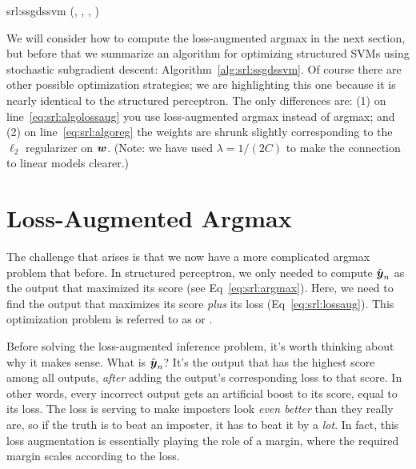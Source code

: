 \newalgorithm%
  {srl:ssgdssvm}%
  {(, , \VARm{\lambda}, \VARm{\ell})}
  {
        \SETST{$\hat \vy$}{$\argmax_{\VARm{\hat\vy} \in \cY(\VARm{\vx})} \dotp{\VARm{\vw}}{\phi(\VARm{\vx},\VARm{\hat\vy})} + \VARm{\ell}(\VARm{\vy}, \VARm{\hat\vy})$} \label{eq:srl:algolossaug}
        \IF{\VAR{$\hat \vy$} $\neq$ \VAR{$\vy$}}
          \SETST{$\vw$}{$\VARm{\vw} + \phi(\VARm{\vx}, \VARm{\vy}) - \phi(\VARm{\vx}, \VARm{\hat \vy})$}
        \ENDIF
         \label{eq:srl:algoreg}
      \ENDFOR
    \ENDFOR
    \RETURN \VAR{$\vw$}
  }


We will consider how to compute the loss-augmented argmax in the next section,
but before that we summarize an algorithm for optimizing structured SVMs using stochastic subgradient descent: Algorithm~\ref{alg:srl:ssgdssvm}. Of course there are other possible optimization strategies; we are highlighting this one because it is nearly identical to the structured perceptron.
The only differences are: (1) on line~\ref{eq:srl:algolossaug} you use loss-augmented argmax instead of argmax; and (2) on line~\ref{eq:srl:algoreg} the weights are shrunk slightly corresponding to the $\ell_2$ regularizer on $\vw$. (Note: we have used $\lambda = 1/(2C)$ to make the connection to linear models clearer.)


\section{Loss-Augmented Argmax}

The challenge that arises is that we now have a more complicated argmax problem that before.
In structured perceptron, we only needed to compute $\hat{{\boldsymbol{y}}}_n$ as the output that maximized its score (see Eq~\ref{eq:srl:argmax}).
Here, we need to find the output that maximizes its score \emph{plus} its loss (Eq~\eqref{eq:srl:lossaug}).
This optimization problem is referred to as  or .

Before solving the loss-augmented inference problem, it's worth thinking about why it makes sense.
What is $\hat{{\boldsymbol{y}}}_n$?
It's the output that has the highest score among all outputs, \emph{after} adding the output's corresponding loss to that score.
In other words, every incorrect output gets an artificial boost to its score, equal to its loss.
The loss is serving to make imposters look \emph{even better} than they really are, so if the truth is to beat an imposter, it has to beat it by a \emph{lot}.
In fact, this loss augmentation is essentially playing the role of a margin, where the required margin scales according to the loss.


